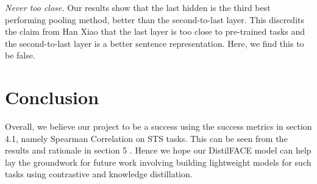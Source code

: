 \documentclass[10pt,twocolumn,letterpaper]{article}
\begin{document}
\textit{Never too close.} Our results show that the last hidden is the third best performing pooling method, better than the second-to-last layer. This discredits the claim from Han Xiao \cite{bert.as.service} that the last layer is too close to pre-trained tasks and the second-to-last layer is a better sentence representation. Here, we find this to be false.




\section{Conclusion}

Overall, we believe our project to be a success using the success metrics  in section 4.1, namely Spearman Correlation on STS tasks. This can be seen from the results and rationale in section 5 . Hence we hope our DistilFACE model can help lay the groundwork for future work involving building lightweight models for such tasks using contrastive and knowledge distillation.


\small{


}
\end{document}
